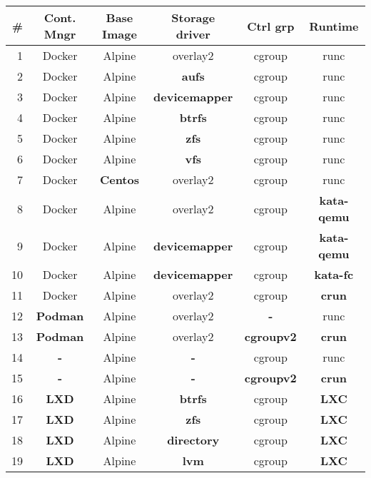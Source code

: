 \begin{table}[!h]
  \begin{center}
    \begin{tabular}{|r|c|c|c|c|c|}
      \hline
      \textbf{\#} & \textbf{Cont. Mngr} & \textbf{Base Image} & \textbf{Storage driver} & \textbf{Ctrl grp} & \textbf{Runtime} \\ \hline \hline
       1  & Docker & Alpine & overlay2 & cgroup & runc \\ \hline \hline
       2  & Docker & Alpine & \textbf{aufs} & cgroup & runc \\ \hline
       3  & Docker & Alpine & \textbf{devicemapper} & cgroup & runc \\ \hline
       4  & Docker & Alpine & \textbf{btrfs} & cgroup & runc \\ \hline
       5  & Docker & Alpine & \textbf{zfs} & cgroup & runc \\ \hline
       6  & Docker & Alpine & \textbf{vfs} & cgroup & runc \\ \hline
       7  & Docker & \textbf{Centos} & overlay2 & cgroup & runc \\ \hline
       8  & Docker & Alpine & overlay2 & cgroup & \textbf{kata-qemu} \\ \hline
       9  & Docker & Alpine & \textbf{devicemapper} & cgroup & \textbf{kata-qemu} \\ \hline
       10 & Docker & Alpine & \textbf{devicemapper} & cgroup & \textbf{kata-fc} \\ \hline
       11 & Docker & Alpine & overlay2 & cgroup & \textbf{crun} \\ \hline
       12 & \textbf{Podman} & Alpine & overlay2 & \textbf{-} & runc \\ \hline
       13 & \textbf{Podman} & Alpine & overlay2 & \textbf{cgroupv2} & \textbf{crun} \\ \hline
       14 & \textbf{-} & Alpine & \textbf{-} & cgroup & runc \\ \hline
       15 & \textbf{-} & Alpine & \textbf{-} & \textbf{cgroupv2} & \textbf{crun} \\ \hline
       16 & \textbf{LXD} & Alpine & \textbf{btrfs} & cgroup & \textbf{LXC} \\ \hline
       17 & \textbf{LXD} & Alpine & \textbf{zfs} & cgroup & \textbf{LXC} \\ \hline
       18 & \textbf{LXD} & Alpine & \textbf{directory} & cgroup & \textbf{LXC} \\ \hline
       19 & \textbf{LXD} & Alpine & \textbf{lvm} & cgroup & \textbf{LXC} \\ \hline
    \end{tabular}
  \end{center}
  \caption{}
  \label{tab:}
\end{table}

